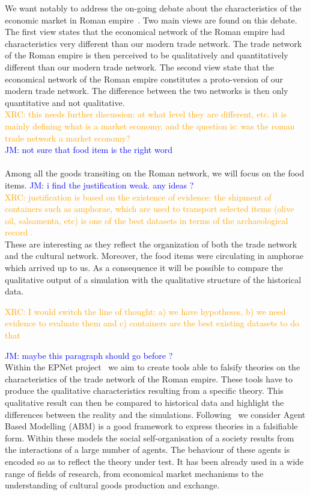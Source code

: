 \documentclass{wscpaperproc}
\newcommand{\memo}[2]{\textcolor{#1}{#2}}
\newcommand{\jm}[1]{\memo{blue}{JM: #1\\}}
\newcommand{\xrc}[1]{\memo{orange}{XRC: #1\\}}
\begin{document}
We want notably to address the on-going debate about the characteristics of the economic market in Roman empire~\cite{polanyi_trade_1957}. Two main views are found on this debate. The first view states that the economical network of the Roman empire had characteristics very different than our modern trade network. The trade network of the Roman empire is then perceived to be qualitatively and quantitatively different than our modern trade network. The second view state that the economical network of the Roman empire constitutes a proto-version of our modern trade network. The difference between the two networks is then only quantitative and not qualitative. 
\\
\xrc{this needs further discussion: at what level they are different, etc. it is mainly defining what is a market economy, and the question is: was the roman trade network a market economy?}
\jm{not sure that food item is the right word}
\\
Among all the goods transiting on the Roman network, we will focus on the food items. 
\jm{i find the justification weak. any ideas ?}
\xrc{justification is based on the existence of evidence: the shipment of containers such as amphorae, which are used to transport selected items (olive oil, salsamenta, etc) is one of the best datasets in terms of the archaeological record \cite{bevan_2014}.}
These are interesting as they reflect the organization of both the trade network and the cultural network. Moreover, the food items were circulating in amphorae which arrived up to us. As a consequence it will be possible to compare the qualitative output of a simulation with the qualitative structure of the historical data.

\xrc{I would switch the line of thought: a) we have hypotheses, b) we need evidence to evaluate them and c) containers are the best existing datasets to do that}

\jm{maybe this paragraph should go before ?}
Within the EPNet project~\cite{remesal_epnet_2014} we aim to create tools able to falsify theories on the characteristics of the trade network of the Roman empire. These tools have to produce the qualitative characteristics resulting from a specific theory. This qualitative result can then be compared to historical data and highlight the differences between the reality and the simulations. Following~\cite{epstein_growing_1996,lake_trends_2014,kohler_dynamics_2000,tesfatsion_agent-based_2003,epstein_why_2008} we consider Agent Based Modelling (ABM) is a good framework to express theories in a falsifiable form. Within these models the social self-organisation of a society results from the interactions of a large number of agents. The behaviour of these agents is encoded so as to reflect the theory under test. It has been already used in a wide range of fields of research, from economical market mechanisms to the understanding of cultural goods production and exchange.
\end{document}
